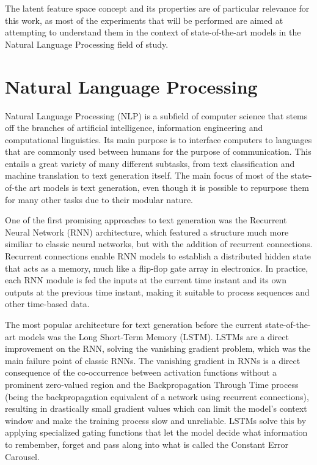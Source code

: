 The latent feature space concept and its properties are of particular relevance for this work, as most of the experiments that will be performed are aimed at attempting to understand them in the context of state-of-the-art models in the Natural Language Processing field of study.

\section{Natural Language Processing}

Natural Language Processing (NLP) is a subfield of computer science that stems off the branches of artificial intelligence, information engineering and computational linguistics.
Its main purpose is to interface computers to languages that are commonly used between humans for the purpose of communication.
This entails a great variety of many different subtasks, from text classification and machine translation to text generation itself.
The main focus of most of the state-of-the art models is text generation, even though it is possible to repurpose them for many other tasks due to their modular nature.

One of the first promising approaches to text generation was the Recurrent Neural Network (RNN) architecture, which featured a structure much more similiar to classic neural networks, but with the addition of recurrent connections.
Recurrent connections enable RNN models to establish a distributed hidden state that acts as a memory, much like a flip-flop gate array in electronics.
In practice, each RNN module is fed the inputs at the current time instant and its own outputs at the previous time instant, making it suitable to process sequences and other time-based data.

The most popular architecture for text generation before the current state-of-the-art models was the Long Short-Term Memory (LSTM).
LSTMs are a direct improvement on the RNN, solving the vanishing gradient problem, which was the main failure point of classic RNNs.
The  vanishing gradient in RNNs is a direct consequence of the co-occurrence between activation functions without a prominent zero-valued region and the Backpropagation Through Time process (being the backpropagation equivalent of a network using recurrent connections), resulting in drastically small gradient values which can limit the model's context window and make the training process slow and unreliable.
LSTMs solve this by applying specialized gating functions that let the model decide what information to rembember, forget and pass along into what is called the Constant Error Carousel.

